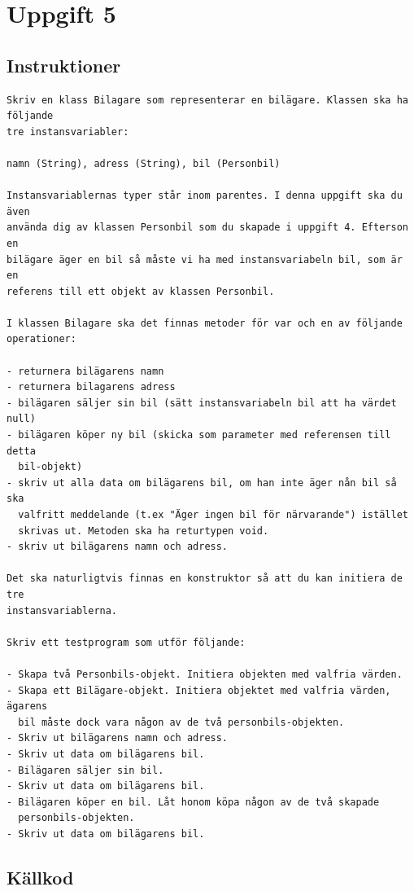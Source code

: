 \section{Uppgift 5}\label{sec:uppg05}

\subsection{Instruktioner}
\begin{Verbatim}[fontsize=\small]
Skriv en klass Bilagare som representerar en bilägare. Klassen ska ha följande
tre instansvariabler:

namn (String), adress (String), bil (Personbil)

Instansvariablernas typer står inom parentes. I denna uppgift ska du även
använda dig av klassen Personbil som du skapade i uppgift 4. Efterson en
bilägare äger en bil så måste vi ha med instansvariabeln bil, som är en
referens till ett objekt av klassen Personbil.

I klassen Bilagare ska det finnas metoder för var och en av följande
operationer:

- returnera bilägarens namn
- returnera bilagarens adress
- bilägaren säljer sin bil (sätt instansvariabeln bil att ha värdet null)
- bilägaren köper ny bil (skicka som parameter med referensen till detta
  bil-objekt)
- skriv ut alla data om bilägarens bil, om han inte äger nån bil så ska
  valfritt meddelande (t.ex "Äger ingen bil för närvarande") istället
  skrivas ut. Metoden ska ha returtypen void.
- skriv ut bilägarens namn och adress.

Det ska naturligtvis finnas en konstruktor så att du kan initiera de tre
instansvariablerna.

Skriv ett testprogram som utför följande:

- Skapa två Personbils-objekt. Initiera objekten med valfria värden.
- Skapa ett Bilägare-objekt. Initiera objektet med valfria värden, ägarens
  bil måste dock vara någon av de två personbils-objekten.
- Skriv ut bilägarens namn och adress.
- Skriv ut data om bilägarens bil.
- Bilägaren säljer sin bil.
- Skriv ut data om bilägarens bil.
- Bilägaren köper en bil. Låt honom köpa någon av de två skapade
  personbils-objekten.
- Skriv ut data om bilägarens bil.
\end{Verbatim}


\subsection{Källkod}

